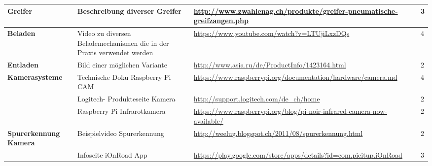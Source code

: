 \begin{tabular}{|p{3cm}|p{3.5cm}|p{5cm}|p{2cm}|}
\textbf{Greifer}	& 	Beschreibung diverser Greifer & \url{http://www.zwahlenag.ch/produkte/greifer-pneumatische-greifzangen.php} & 3 \\\hline	
\textbf{Beladen}	& 	Video zu diversen Belademechanismen die in der Praxis verwendet werden & \url{https://www.youtube.com/watch?v=LTUjiLxzDQs} & 4 \\\hline
\textbf{Entladen}	& 	Bild einer möglichen Variante & \url{http://www.asia.ru/de/ProductInfo/1423164.html} & 2 \\\hline	
\textbf{Kamerasysteme} & Technische Doku Raspberry Pi CAM & \url{https://www.raspberrypi.org/documentation/hardware/camera.md} & 4 \\ \hline
                    & Logitech- Produkteseite Kamera  & \url{http://support.logitech.com/de_ch/home} & 2 \\ \hline
                    & Raspberry Pi Infrarotkamera & \url{https://www.raspberrypi.org/blog/pi-noir-infrared-camera-now-available/} & 2\\ \hline                    
\textbf{Spurerkennung Kamera} & Beispielvideo Spurerkennung & \url{http://weelug.blogspot.ch/2011/08/spurerkennung.html} & 2\\ \hline
                              & Infoseite iOnRoad App & \url{https://play.google.com/store/apps/details?id=com.picitup.iOnRoad} & 3\\ \hline
\end{tabular}\\